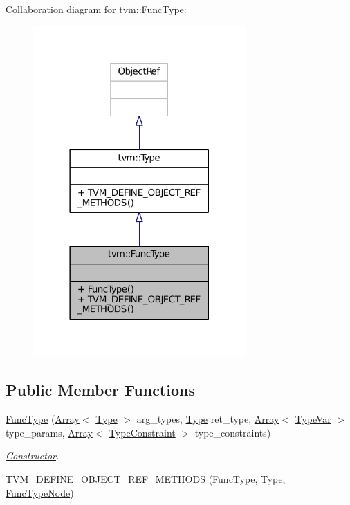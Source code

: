 Collaboration diagram for tvm\+:\+:Func\+Type\+:
\nopagebreak
\begin{figure}[H]
\begin{center}
\leavevmode
\includegraphics[width=230pt]{classtvm_1_1FuncType__coll__graph}
\end{center}
\end{figure}
\subsection*{Public Member Functions}
\begin{DoxyCompactItemize}
\item 
\hyperlink{classtvm_1_1FuncType_ac463535a237db243457233a436836cf3}{Func\+Type} (\hyperlink{classtvm_1_1Array}{Array}$<$ \hyperlink{classtvm_1_1Type}{Type} $>$ arg\+\_\+types, \hyperlink{classtvm_1_1Type}{Type} ret\+\_\+type, \hyperlink{classtvm_1_1Array}{Array}$<$ \hyperlink{classtvm_1_1TypeVar}{Type\+Var} $>$ type\+\_\+params, \hyperlink{classtvm_1_1Array}{Array}$<$ \hyperlink{classtvm_1_1TypeConstraint}{Type\+Constraint} $>$ type\+\_\+constraints)
\begin{DoxyCompactList}\small\item\em \hyperlink{classtvm_1_1Constructor}{Constructor}. \end{DoxyCompactList}\item 
\hyperlink{classtvm_1_1FuncType_ac586d17a90973700b2b322deab90189c}{T\+V\+M\+\_\+\+D\+E\+F\+I\+N\+E\+\_\+\+O\+B\+J\+E\+C\+T\+\_\+\+R\+E\+F\+\_\+\+M\+E\+T\+H\+O\+DS} (\hyperlink{classtvm_1_1FuncType}{Func\+Type}, \hyperlink{classtvm_1_1Type}{Type}, \hyperlink{classtvm_1_1FuncTypeNode}{Func\+Type\+Node})
\end{DoxyCompactItemize}


